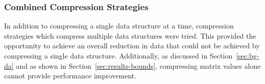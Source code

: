 \subsubsection{Combined Compression Strategies}
\label{sec:bg-comp-combined}
In addition to compressing a single data structure at a time, compression strategies which compress multiple data structures were tried.
This provided the opportunity to achieve an overall reduction in data that could not be achieved by compressing a single data structure.
Additionally, as discussed in Section~\ref{sec:bg-da} and as shown in Section~\ref{sec:results-bounds}, compressing matrix values alone cannot provide performance improvement.

